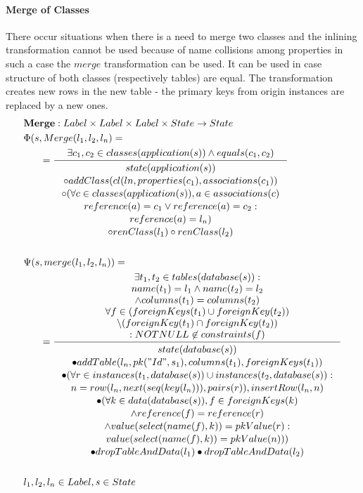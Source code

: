 \documentclass[11pt]{article}
\begin{document}
\paragraph{Merge of Classes} There occur situations when there is a need to merge two classes and the inlining transformation cannot be used because of name collisions among properties in such a case the $merge$ transformation can be used. It can be used in case structure of both classes (respectively tables) are equal. The transformation creates new rows in the new table - the primary keys from origin instances are replaced by a new ones.
\begin{align*}
&	\mathbf{Merge} : Label \times Label \times Label \times State \rightarrow State \\
&	\Phi(s, Merge(l_1, l_2, l_n) = \\
& \;\;\;\;\;\; = \inference{
		\exists c_1, c_2 \in classes(application(s)) \wedge 
		equals(c_1, c_2)}{\begin{gathered}
			state(application(s)) \\ \circ addClass(cl(ln, properties(c_1), associations(c_1)) \\
			\circ (\forall c \in classes (application(s)), a \in associations(c) \\
			reference(a) = c_1 \vee reference(a) = c_2 : \\
			reference(a) = l_n) \\
			\circ renClass(l_1) \circ renClass(l_2) \end{gathered}}
 \\\\
&	\Psi(s, merge(l_1, l_2, l_n)) = \\
& \;\;\;\;\;\; = \inference{\exists t_1, t_2 \in tables(database(s)) : \\ name(t_1) = l_1 \wedge name(t_2) = l_2 \\ \wedge columns(t_1) = columns(t_2)\\
\forall f \in (foreignKeys(t_1) \cup foreignKey(t_2)) \\ \setminus (foreignKey(t_1) \cap foreignKey(t_2)) \\ : NOTNULL \not \in constraints(f)  }{\begin{gathered}
	state(database(s)) \\ \bullet addTable(l_n, pk("Id", s_1), columns(t_1), foreignKeys(t_1)) \\ 
\bullet (\forall r \in instances(t_1, database(s)) \cup instances(t_2, database(s)) :  \\ n =  row(l_n, next(seq(key(l_n))), pairs(r)), insertRow(l_n, n) \\ 
\bullet (\forall k \in data(database(s)), f \in foreignKeys(k) \\ \wedge reference(f) = reference(r) \\ \wedge value(select(name(f), k)) = pkValue(r) : \\value(select(name(f), k)) = pkValue(n))) \\  \bullet dropTableAndData(l_1) \bullet dropTableAndData(l_2)
 \end{gathered}} \\\\
 & l_1, l_2, l_n \in Label, s \in State
\end{align*}
\end{document}
